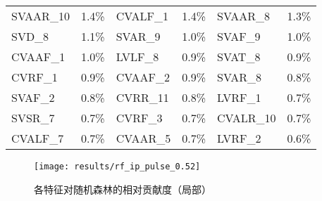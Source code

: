 \begin{center}
\begin{longtable}{m{2cm}<{\centering}m{2cm}<{\centering}m{2cm}<{\centering}m{2cm}<{\centering}m{2cm}<{\centering}m{2cm}<{\centering}}
            \cellcolor{pink}SVAAR\_10                        & \cellcolor{pink}1.4\%                            & \cellcolor{cyan}CVALF\_1                         & \cellcolor{cyan}1.4\%                            & \cellcolor{pink}SVAAR\_8                         & \cellcolor{pink}1.3\%                            \\
            SVD\_8                                           & 1.1\%                                            & \cellcolor{pink}SVAR\_9                          & \cellcolor{pink}1.0\%                            & \cellcolor{cyan}SVAF\_9                          & \cellcolor{cyan}1.0\%                            \\
            \cellcolor{cyan}CVAAF\_1                         & \cellcolor{cyan}1.0\%                            & \cellcolor{cyan}LVLF\_8                          & \cellcolor{cyan}0.9\%                            & SVAT\_8                          & 0.9\%                            \\
            \cellcolor{cyan}CVRF\_1                          & \cellcolor{cyan}0.9\%                            & \cellcolor{cyan}CVAAF\_2                         & \cellcolor{cyan}0.9\%                            & \cellcolor{pink}SVAR\_8                          & \cellcolor{pink}0.8\%                            \\
            \cellcolor{cyan}SVAF\_2                          & \cellcolor{cyan}0.8\%                            & \cellcolor{pink}CVRR\_11                         & \cellcolor{pink}0.8\%                            & \cellcolor{cyan}LVRF\_1                          & \cellcolor{cyan}0.7\%                            \\
            \cellcolor{pink}SVSR\_7                          & \cellcolor{pink}0.7\%                            & \cellcolor{cyan}CVRF\_3                          & \cellcolor{cyan}0.7\%                            & \cellcolor{pink}CVALR\_10                        & \cellcolor{pink}0.7\%                            \\
            \cellcolor{cyan}CVALF\_7                         & \cellcolor{cyan}0.7\%                            & \cellcolor{pink}CVAAR\_5                         & \cellcolor{pink}0.7\%                            & \cellcolor{cyan}LVRF\_2                          & \cellcolor{cyan}0.6\%                           
      \end{longtable}
\end{center}

\begin{figure}[htbp]
      \centering
      \texttt{[image: results/rf\_ip\_pulse\_0.52]}
      \caption[各特征对随机森林的相对贡献度（局部）]{\label{fig:rf_importance_pulse}各特征对随机森林的相对贡献度（局部）}
\end{figure}

